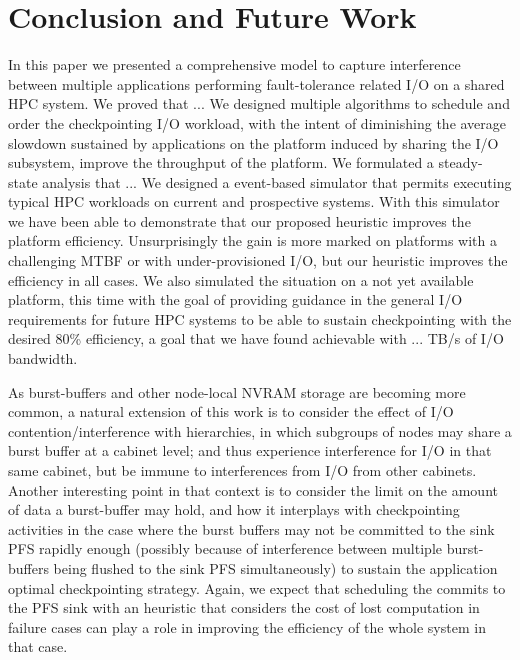 \section{Conclusion and Future Work}
\label{sec:conclusion}

In this paper we presented a comprehensive model to capture interference
between multiple applications performing fault-tolerance related I/O
on a shared HPC system. We proved that ... We designed multiple algorithms
to schedule and order the checkpointing I/O workload, with the intent of
diminishing the average slowdown sustained by applications on the
platform induced by sharing the I/O subsystem, \ie improve the throughput
of the platform. We formulated a steady-state analysis that ...
We designed a event-based simulator that permits
executing typical HPC workloads on current and prospective systems.
With this simulator we have been able to demonstrate that our proposed
heuristic improves the platform efficiency. Unsurprisingly the gain is
more marked on platforms with a challenging MTBF or with
under-provisioned I/O, but our heuristic improves the efficiency in
all cases.  We also simulated the situation on a not yet available
platform, this time with the goal of providing guidance in the
general I/O requirements for future HPC systems to be able to
sustain checkpointing with the desired 80\% efficiency, a goal that
we have found achievable with ... TB/s of I/O bandwidth.

As burst-buffers and other node-local NVRAM storage are becoming
more common, a natural extension of this work is to consider the effect
 of I/O contention/interference with hierarchies, in which subgroups of nodes
may share a burst buffer at a cabinet level; and thus experience
interference for I/O in that same cabinet, but be immune to interferences
from I/O from other cabinets. Another interesting point in that context
is to consider the limit on the amount of data a burst-buffer may hold,
and how it interplays with checkpointing activities in the case where the burst
buffers may not be committed to the sink PFS rapidly enough (possibly
because of interference between multiple burst-buffers being
flushed to the sink PFS simultaneously) to sustain the application
optimal checkpointing strategy. Again, we expect that scheduling the
commits to the PFS sink with an heuristic that considers the cost of
lost computation in failure cases can play a role in improving the
efficiency of the whole system in that case.
